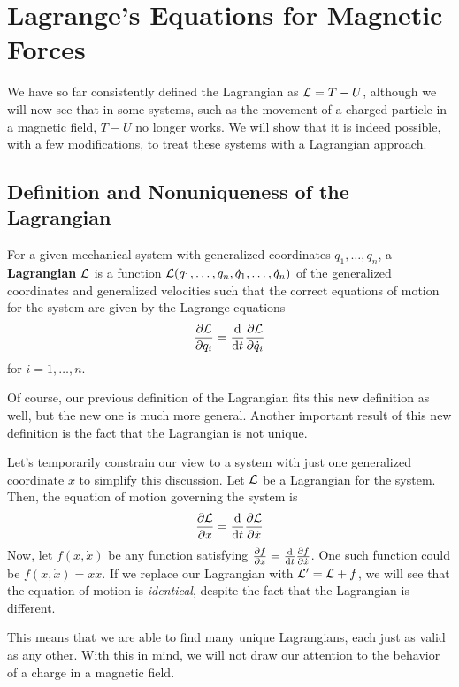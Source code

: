 \section{Lagrange's Equations for Magnetic Forces}
We have so far consistently defined the Lagrangian as $\mathcal{L} = T - U$, although we will now see that in some systems, such as the movement of a charged particle in a magnetic field, $T-U$ no longer works. We will show that it is indeed possible, with a few modifications, to treat these systems with a Lagrangian approach. 
\subsection*{Definition and Nonuniqueness of the Lagrangian}
\begin{definition}
    For a given mechanical system with generalized coordinates $q_1, \dots, q_n$, a \textbf{Lagrangian} $\mathcal{L}$ is a function $\mathcal{L}(q_1, \dots, q_n, \dot q_1, \dots, \dot q_n)$ of the generalized coordinates and generalized velocities such that the correct equations of motion for the system are given by the Lagrange equations
    \[ \pdv{\mathcal{L}}{q_i} = \dv{t} \pdv{\mathcal{L}}{\dot q_i} \]
    for $i = 1, \dots, n$. 
\end{definition}
Of course, our previous definition of the Lagrangian fits this new definition as well, but the new one is much more general. Another important result of this new definition is the fact that the Lagrangian is not unique. 

Let's temporarily constrain our view to a system with just one generalized coordinate $x$ to simplify this discussion. Let $\mathcal{L}$ be a Lagrangian for the system. Then, the equation of motion governing the system is 
\[ \pdv{\mathcal{L}}{x} = \dv{t} \pdv{\mathcal{L}}{\dot x} \]
Now, let $f(x, \dot x)$ be any function satisfying $\pdv{f}{x} = \dv{t} \pdv{f}{\dot x}$. One such function could be $f(x, \dot x) = x\dot x$. If we replace our Lagrangian with $\mathcal{L}' = \mathcal{L} + f$, we will see that the equation of motion is \textit{identical}, despite the fact that the Lagrangian is different. 

This means that we are able to find many unique Lagrangians, each just as valid as any other. With this in mind, we will not draw our attention to the behavior of a charge in a magnetic field.
